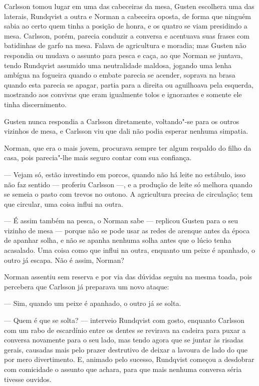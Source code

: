 Carlsson tomou lugar em uma das cabeceiras da mesa, Gusten escolhera uma das
laterais, Rundqvist a outra e Norman a cabeceira oposta, de forma que ninguém
sabia ao certo quem tinha a posição de honra, e os quatro se viam presidindo a
mesa. Carlsson, porém, parecia conduzir a conversa e acentuava suas
frases com batidinhas de garfo na mesa. Falava de agricultura e
moradia; mas Gusten não respondia ou mudava o assunto para pesca e caça, ao que
Norman se juntava, tendo Rundqvist assumido uma neutralidade maldosa, jogando
uma lenha ambígua na fogueira quando o embate parecia se acender, soprava na
brasa quando esta parecia se apagar, partia para a direita ou aguilhoava pela
esquerda, mostrando aos convivas que eram igualmente tolos e ignorantes
e somente ele tinha discernimento.

Gusten nunca respondia a Carlsson diretamente, voltando"-se para os outros
vizinhos de mesa, e Carlsson viu que dali não podia esperar nenhuma simpatia.

Norman, que era o mais jovem, procurava sempre ter algum respaldo do filho
da casa, pois parecia"-lhe mais seguro contar com sua confiança.

--- Vejam só, estão investindo em porcos, quando não há leite no estábulo, isso
não faz sentido --- proferiu Carlsson ---, e a produção de leite só melhora quando
se semeia o pasto com trevos no outono. A agricultura precisa de
circulação; tem que circular, uma coisa influi na outra.

--- É assim também na pesca, o Norman sabe --- replicou Gusten para o seu vizinho
de mesa --- porque não se pode usar as redes de arenque antes da época de apanhar
solha, e não se apanha nenhuma solha antes que o lúcio tenha acasalado. Uma
coisa como que influi na outra, enquanto um peixe é apanhado, o outro já escapa.
Não é assim, Norman?

Norman assentiu sem reserva e por via das dúvidas seguiu na mesma toada, pois
percebera que Carlsson já preparava um novo ataque:

--- Sim, quando um peixe é apanhado, o outro já se solta.

--- Quem é que se solta? --- interveio Rundqvist com gosto, enquanto Carlsson com
um rabo de escardínio entre os dentes se revirava na cadeira para puxar a
conversa novamente para o seu lado, mas tendo agora que se juntar às risadas
gerais, causadas mais pelo prazer destrutivo de deixar a lavoura de lado do que
por mero divertimento. E, animado pelo sucesso, Rundqvist começou a desdobrar com
comicidade o assunto que achara, para que mais nenhuma conversa séria tivesse
ouvidos.

